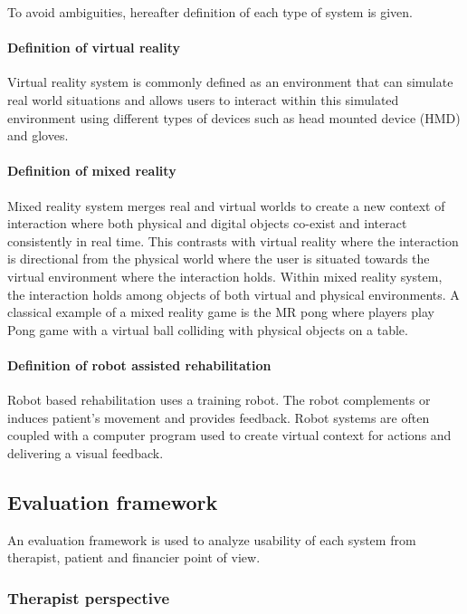 \documentclass[preprint,authoryear,12pt]{elsarticle}
\begin{document}
To avoid ambiguities, hereafter definition of each type of system is given.
\paragraph{Definition of virtual reality}

Virtual reality system is commonly defined as an environment that can simulate real world situations and allows users to interact within this simulated environment using different types of devices such as head mounted device (HMD) and gloves.

\paragraph{Definition of mixed reality}

Mixed reality system merges real and virtual worlds to create a new context of interaction where both physical and digital objects co-exist and interact consistently in real time. This contrasts with virtual reality where the interaction is directional from the physical world where the user is situated towards the virtual environment where the interaction holds. Within mixed reality system, the interaction holds among objects of both virtual and physical environments. A classical example of a mixed reality game is the MR pong \citep{Kiia2001}  where players play Pong game with a virtual ball colliding with physical objects on a table.

\paragraph{Definition of robot assisted rehabilitation}

Robot based rehabilitation uses a training robot. The robot complements or induces patient's movement and provides feedback. Robot systems are often coupled with a computer program used to create virtual context for actions and delivering a visual feedback.

\subsection{Evaluation framework}

An evaluation framework is used to analyze usability of each system from therapist, patient and financier point of view.

\subsubsection{Therapist perspective}
\end{document}
